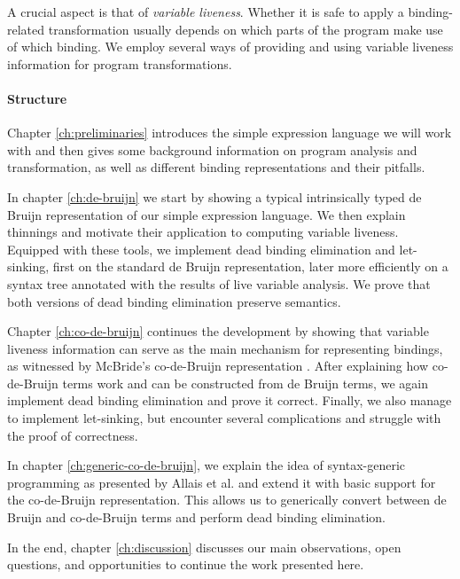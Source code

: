     A crucial aspect is that of \emph{variable liveness}.
    Whether it is safe to apply a binding-related transformation
    usually depends on which parts of the program make use of which binding.
    We employ several ways of providing and using variable liveness information
    for program transformations.

  \paragraph{Structure}
    Chapter \ref{ch:preliminaries}
    introduces the simple expression language we will work with
    and then gives some background information on program analysis and transformation,
    as well as different binding representations and their pitfalls.

    In chapter \ref{ch:de-bruijn} we start by
    showing a typical intrinsically typed de Bruijn representation of our simple expression language.
    We then explain thinnings and motivate their application to computing variable liveness.
    Equipped with these tools,
    we implement dead binding elimination and let-sinking,
    first on the standard de Bruijn representation,
    later more efficiently on a syntax tree annotated with the results of live variable analysis.
    We prove that both versions of dead binding elimination preserve semantics.

    Chapter \ref{ch:co-de-bruijn} continues the development by showing that variable liveness information
    can serve as the main mechanism for representing bindings, as witnessed by
    McBride's co-de-Bruijn representation
    \cite{McBride2018EveryBodysGotToBeSomewhere}.
    After explaining how co-de-Bruijn terms work and can be constructed from de Bruijn terms,
    we again implement dead binding elimination and prove it correct.
    Finally, we also manage to implement let-sinking, but encounter several complications
    and struggle with the proof of correctness.

    In chapter \ref{ch:generic-co-de-bruijn}, we explain the idea of syntax-generic programming
    as presented by Allais et al.
    \cite{Allais2018UniverseOfSyntaxes}
    and extend it with basic support for the co-de-Bruijn representation.
    This allows us to generically convert between de Bruijn and co-de-Bruijn terms
    and perform dead binding elimination.

    In the end, chapter \ref{ch:discussion} discusses our main observations,
    open questions, and opportunities to continue the work presented here.

